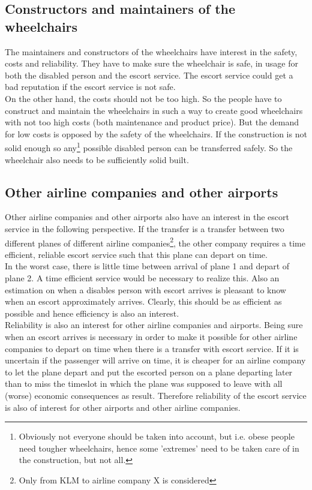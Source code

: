 \documentclass[a4paper, 11pt, notitlepage]{report}
\begin{document}
\subsection{Constructors and maintainers of the wheelchairs}
The maintainers and constructors of the wheelchairs have interest in the safety, costs and reliability. They have to make sure the wheelchair is safe,  in usage for both the disabled person and the escort service. The escort service could get a bad reputation if the escort service is not safe.\\
On the other hand, the costs should not be too high. So the people have to construct and maintain the wheelchairs in such a way to create good wheelchairs with not too high costs (both maintenance and product price). But the demand for low costs is opposed by the safety of the wheelchairs. If the construction is not solid enough so any\footnote{Obviously not everyone should be taken into account, but i.e. obese people need tougher wheelchairs, hence some 'extremes' need to be taken care of in the construction, but not all.} possible disabled person can be transferred safely. So the wheelchair also needs to be sufficiently solid built.
\subsection{Other airline companies and other airports}
Other airline companies and other airports also have an interest in the escort service in the following perspective. If the transfer is a transfer between two different planes of different airline companies\footnote{Only from KLM to airline company X is considered}, the other company requires a time efficient, reliable escort service such that this plane can depart on time.\\
In the worst case, there is little time between arrival of plane 1 and depart of plane 2. A time efficient service would be necessary to realize this. Also an estimation on when a disables person with escort arrives is pleasant to know when an escort approximately arrives. Clearly, this should be as efficient as possible and hence efficiency is also an interest.\\
Reliability is also an interest for other airline companies and airports. Being sure when an escort arrives is necessary in order to make it possible for other airline companies to depart on time when there is a transfer with escort service. If it is uncertain if the passenger will arrive on time, it is cheaper for an airline company to let the plane depart and put the escorted person on a plane departing later than to miss the timeslot in which the plane was supposed to leave with all (worse) economic consequences as result. Therefore reliability of the escort service is also of interest for other airports and other airline companies.
\newpage
\end{document}
